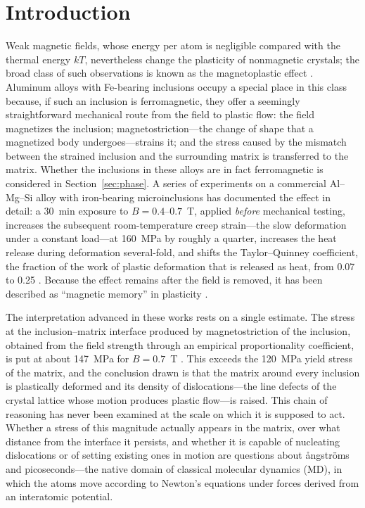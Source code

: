 \section{Introduction}
\label{sec:intro}

Weak magnetic fields, whose energy per atom is negligible compared with the
thermal energy $kT$, nevertheless change the plasticity of nonmagnetic
crystals; the broad class of such observations is known as the magnetoplastic
effect \cite{Alshits2003,Molotskii2000}. Aluminum alloys with Fe-bearing
inclusions occupy a special place in this class because, if such an inclusion
is ferromagnetic, they offer a seemingly straightforward mechanical route from
the field to plastic flow: the field magnetizes the inclusion;
magnetostriction---the change of shape that a magnetized body
undergoes---strains it; and the stress caused by the mismatch between the
strained inclusion and the surrounding matrix is transferred to the matrix.
Whether the inclusions in these alloys are in fact ferromagnetic is considered
in Section~\ref{sec:phase}. A series of experiments on a commercial
Al--Mg--Si alloy with iron-bearing microinclusions has documented the effect
in detail: a 30~min exposure to $B=0.4$--$0.7$~T, applied \emph{before}
mechanical testing, increases the subsequent room-temperature creep
strain---the slow deformation under a constant load---at 160~MPa by roughly a
quarter, increases the heat release during deformation several-fold, and
shifts the Taylor--Quinney coefficient, the fraction of the work of plastic
deformation that is released as heat, from 0.07 to 0.25
\cite{Skvortsov2019JAP,Skvortsov2019PSS,Friha2024JMMM,Nikolaev2025SciRep}.
Because the effect remains after the field is removed, it has been described
as ``magnetic memory'' in plasticity \cite{Skvortsov2019PSS}.

The interpretation advanced in these works rests on a single estimate. The
stress at the inclusion--matrix interface produced by magnetostriction of the
inclusion, obtained from the field strength through an empirical
proportionality coefficient, is put at about 147~MPa for $B=0.7$~T
\cite{Friha2024JMMM}. This exceeds the 120~MPa yield stress of the matrix,
and the conclusion drawn is that the matrix around every inclusion is
plastically deformed and its density of dislocations---the line defects of
the crystal lattice whose motion produces plastic flow---is raised. This chain
of reasoning has never been examined at the scale on which it is supposed to
act. Whether a stress of this magnitude actually appears in the matrix, over
what distance from the interface it persists, and whether it is capable of
nucleating dislocations or of setting existing ones in motion are questions
about {\aa}ngstr{\"o}ms and picoseconds---the native domain of classical
molecular dynamics (MD), in which the atoms move according to Newton's
equations under forces derived from an interatomic potential.

